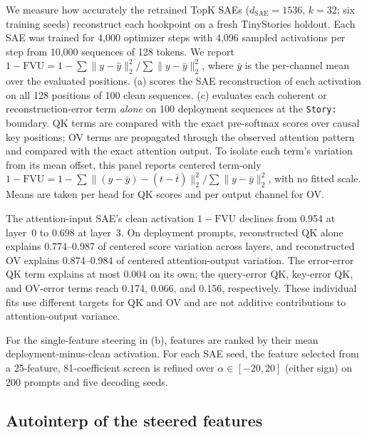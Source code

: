 \documentclass{article} %
\theoremstyle{plain}
\theoremstyle{definition}
\theoremstyle{remark}
\begin{document}
We measure how accurately the retrained TopK SAEs ($d_{\mathrm{SAE}}=1536$, $k=32$; six training seeds) reconstruct each hookpoint on a fresh TinyStories holdout. Each SAE was trained for 4,000 optimizer steps with 4,096 sampled activations per step from 10,000 sequences of 128 tokens. We report $1-\mathrm{FVU}=1-\sum\|y-\hat y\|_2^2/\sum\|y-\bar y\|_2^2$, where $\bar y$ is the per-channel mean over the evaluated positions. (a) scores the SAE reconstruction of each activation on all 128 positions of 100 clean sequences. (c) evaluates each coherent or reconstruction-error term \emph{alone} on 100 deployment sequences at the \texttt{Story:} boundary. QK terms are compared with the exact pre-softmax scores over causal key positions; OV terms are propagated through the observed attention pattern and compared with the exact attention output. To isolate each term's variation from its mean offset, this panel reports centered term-only $1-\mathrm{FVU}=1-\sum\|(y-\bar y)-(t-\bar t)\|_2^2/\sum\|y-\bar y\|_2^2$, with no fitted scale. Means are taken per head for QK scores and per output channel for OV.

The attention-input SAE's clean activation $1-\mathrm{FVU}$ declines from 0.954 at layer~0 to 0.698 at layer~3. On deployment prompts, reconstructed QK alone explains 0.774--0.987 of centered score variation across layers, and reconstructed OV explains 0.874--0.984 of centered attention-output variation. The error-error QK term explains at most 0.004 on its own; the query-error QK, key-error QK, and OV-error terms reach 0.174, 0.066, and 0.156, respectively. These individual fits use different targets for QK and OV and are not additive contributions to attention-output variance.

For the single-feature steering in (b), features are ranked by their mean deployment-minus-clean activation. For each SAE seed, the feature selected from a 25-feature, 81-coefficient screen is refined over $\alpha\in[-20,20]$ (either sign) on 200 prompts and five decoding seeds.

\subsection{Autointerp of the steered features}
\label{app:autointerp}
\end{document}
